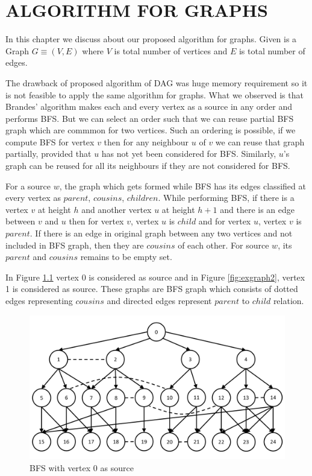 \chapter{ALGORITHM FOR GRAPHS}
\label{chap:graph}
 
In this chapter we discuss about our proposed algorithm for graphs. 
Given is a Graph $G \equiv (V,E)$ where $V$ is total number of vertices and $E$ is total number of edges.

The drawback of proposed algorithm of DAG was huge memory requirement so it is not feasible to apply the same algorithm for graphs. 
What we observed is that Brandes' algorithm makes each and every vertex as a source in any order and performs BFS. But we can select an order such that we can reuse partial BFS graph which are commmon for two vertices. Such an ordering is possible, if we compute BFS for vertex $v$ then for any neighbour $u$ of $v$ we can reuse that graph partially, provided that $u$ has not yet been considered for BFS. Similarly, $u$'s graph can be reused for all its neighbours if they are not considered for BFS.

For a source $w$, the graph which gets formed while BFS has its edges classified at every vertex as $parent$, $cousins$, $children$.
While performing BFS, if there is a vertex $v$ at height $h$ and another vertex $u$ at height $h+1$ and there is an edge between $v$ and $u$ then for vertex $v$, vertex $u$ is $child$ and for vertex $u$, vertex $v$ is $parent$.
If there is an edge in original graph between any two vertices and not included in BFS graph, then they are $cousins$ of each other.
For source $w$, its $parent$ and $cousins$ remains to be empty set.

In Figure \ref{fig:exgraph1} vertex 0 is considered as source and in Figure \ref{fig:exgraph2}, vertex 1 is considered as source. These graphs are BFS graph which consists of dotted edges representing $cousins$ and directed edges represent $parent$ to $child$ relation.

\begin{figure}
\hspace{-4.5em}
\includegraphics[width=19cm]{images/Slide1.PNG}
\caption{BFS with vertex 0 as source}
\label{fig:exgraph1}
\end{figure}

